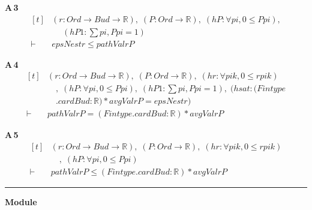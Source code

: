 \noindent\textbf{A\,3}\quad{}
{\footnotesize\[ \begin{aligned}[t]
&(\mathit{r} : \mathit{Ord} \to \mathit{Bud} \to \mathbb{R} ),\; (\mathit{P} : \mathit{Ord} \to \mathbb{R} ),\; (\mathit{hP} : \forall \mathit{pi}, 0 \leq \mathit{P} \mathit{pi}),\\
&\quad \; (\mathit{hP1} : \textstyle\sum \mathit{pi}, \mathit{P} \mathit{pi} = 1)\\
\vdash\;&\mathit{epsNest} \mathit{r} \leq \mathit{pathVal} \mathit{r} \mathit{P}
\end{aligned} \]}

\noindent\textbf{A\,4}\quad{}
{\footnotesize\[ \begin{aligned}[t]
&(\mathit{r} : \mathit{Ord} \to \mathit{Bud} \to \mathbb{R} ),\; (\mathit{P} : \mathit{Ord} \to \mathbb{R} ),\; (\mathit{hr} : \forall \mathit{pi} \mathit{k}, 0 \leq \mathit{r} \mathit{pi} \mathit{k})\\
&\quad ,\; (\mathit{hP} : \forall \mathit{pi}, 0 \leq \mathit{P} \mathit{pi}),\; (\mathit{hP1} : \textstyle\sum \mathit{pi}, \mathit{P} \mathit{pi} = 1),\; (\mathit{hsat} : (\mathit{Fintype}\\
&\quad .\mathit{card} \mathit{Bud} : \mathbb{R} ) * \mathit{avgVal} \mathit{r} \mathit{P} = \mathit{epsNest} \mathit{r})\\
\vdash\;&\mathit{pathVal} \mathit{r} \mathit{P} = (\mathit{Fintype}.\mathit{card} \mathit{Bud} : \mathbb{R} ) * \mathit{avgVal} \mathit{r} \mathit{P}
\end{aligned} \]}

\noindent\textbf{A\,5}\quad{}
{\footnotesize\[ \begin{aligned}[t]
&(\mathit{r} : \mathit{Ord} \to \mathit{Bud} \to \mathbb{R} ),\; (\mathit{P} : \mathit{Ord} \to \mathbb{R} ),\; (\mathit{hr} : \forall \mathit{pi} \mathit{k}, 0 \leq \mathit{r} \mathit{pi} \mathit{k})\\
&\quad ,\; (\mathit{hP} : \forall \mathit{pi}, 0 \leq \mathit{P} \mathit{pi})\\
\vdash\;&\mathit{pathVal} \mathit{r} \mathit{P} \leq (\mathit{Fintype}.\mathit{card} \mathit{Bud} : \mathbb{R} ) * \mathit{avgVal} \mathit{r} \mathit{P}
\end{aligned} \]}

\vspace{4pt}\noindent\rule{\columnwidth}{0.4pt}\par\vspace{2pt}
\noindent\textbf{Module }\par\vspace{3pt}

